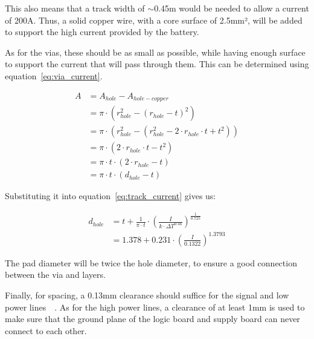 \documentclass[ti,oneside,10pt]{uantwerpenreport}
\begin{document}
\vspace{-6pt}
This also means that a track width of $\sim$0.45m would be needed to allow a current of 200A.
Thus, a solid copper wire, with a core surface of 2.5mm², will be added to support the high current provided by the battery.

As for the vias, these should be as small as possible, while having enough surface to support the current that will pass through them.
This can be determined using equation~\ref{eq:via_current}.

\vspace{-18pt}
\begin{align}
    \label{eq:via_surface}
    A & = A_{hole} - A_{hole - copper} \\
	  & = \pi \cdot (r_{hole}^{2} - (r_{hole} - t)^{2}) \\
	  & = \pi \cdot (r_{hole}^{2} - (r_{hole}^{2} - 2 \cdot r_{hole} \cdot t + t^{2})) \\
	  & = \pi \cdot (2 \cdot r_{hole} \cdot t - t^{2}) \\
	  & = \pi \cdot t \cdot (2 \cdot r_{hole} - t) \\
	  & = \pi \cdot t \cdot (d_{hole} - t)
\end{align}

\vspace{-6pt}
Substituting it into equation~\ref{eq:track_current} gives us:

\vspace{-18pt}
\begin{align}
    d_{hole} & = t + \frac{1}{\pi \cdot t} \cdot \left(\frac{I}{k \cdot \Delta T^{0.44}}\right)^{\frac{1}{0.725}} \\
	\label{eq:via_current}
             & = 1.378 + 0.231 \cdot \left(\frac{I}{0.1322}\right)^{1.3793}
\end{align}

\vspace{-6pt}
The pad diameter will be twice the hole diameter, to ensure a good connection between the via and layers.

Finally, for spacing, a 0.13mm clearance should suffice for the signal and low power lines~~\cite{Daems2023}.
As for the high power lines, a clearance of at least 1mm is used to make sure that the ground plane of the logic board and supply board can never connect to each other.
\end{document}
